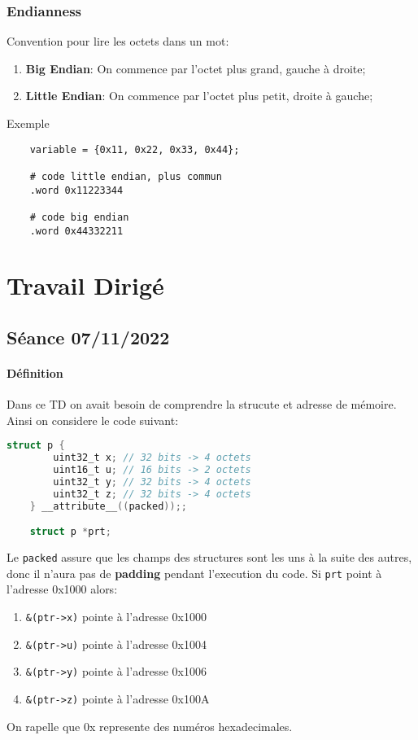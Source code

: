 \documentclass{article}
\begin{document}
\subsubsection{Endianness}
\begin{definition}
    Convention pour lire les octets dans un mot:
    \begin{enumerate}[noitemsep]
        \item \textbf{Big Endian}: On commence par l'octet plus grand, gauche à droite;
        \item \textbf{Little Endian}: On commence par l'octet plus petit, droite à gauche;
    \end{enumerate}
    Exemple    
    \begin{scriptsize}\myRISCV
        \begin{lstlisting}
    variable = {0x11, 0x22, 0x33, 0x44};
    
    # code little endian, plus commun
    .word 0x11223344
    
    # code big endian
    .word 0x44332211
        \end{lstlisting}
    \end{scriptsize}
\end{definition}


\section{Travail Dirigé}
\subsection{Séance 07/11/2022}
\paragraph{Définition}Dans ce TD on avait besoin de comprendre la strucute et adresse de mémoire. Ainsi on considere le code suivant:
\begin{scriptsize}\mycode
    \begin{lstlisting}[language=C]
    struct p {
        uint32_t x; // 32 bits -> 4 octets
        uint16_t u; // 16 bits -> 2 octets
        uint32_t y; // 32 bits -> 4 octets
        uint32_t z; // 32 bits -> 4 octets
    } __attribute__((packed));;

    struct p *prt;
    \end{lstlisting}
\end{scriptsize}
Le \texttt{packed} assure que les champs des structures sont les uns à la suite des autres, donc il n'aura pas de \textbf{padding} pendant l'execution du code. Si \texttt{prt} point à l'adresse 0x1000 alors:
\begin{enumerate}[noitemsep]
    \item \texttt{\&(ptr->x)} pointe à l'adresse 0x1000
    \item \texttt{\&(ptr->u)} pointe à l'adresse 0x1004
    \item \texttt{\&(ptr->y)} pointe à l'adresse 0x1006
    \item \texttt{\&(ptr->z)} pointe à l'adresse 0x100A
\end{enumerate}
On rapelle que 0x represente des numéros hexadecimales.
\end{document}
